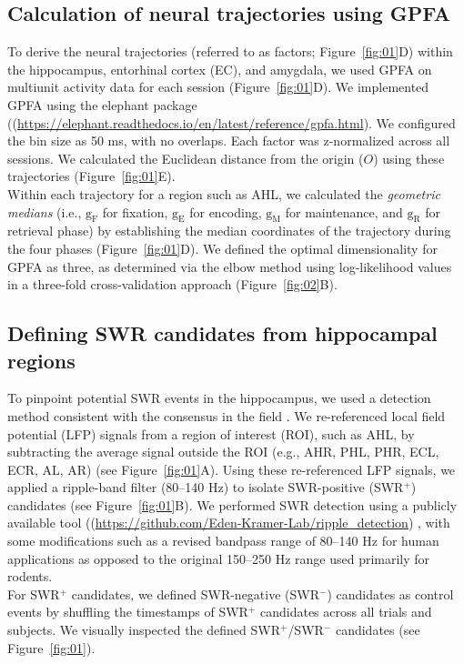 \documentclass[final,3p,times,twocolumn]{elsarticle}
\newcommand{\REDSTARTS}{\color{red}}
\newcommand{\GREENENDS}{\color{black}}
\begin{document}
\begin{abstract\GREENENDS \REDSTARTS ll_Tables}
\subsection{Calculation of neural trajectories using GPFA}
To derive the neural trajectories (referred to as factors; Figure~\ref{fig:01}D) within the hippocampus, entorhinal cortex (EC), and amygdala, we used GPFA \cite{yu_gaussian-process_2009} on multiunit activity data for each session (Figure~\ref{fig:01}D). We implemented GPFA using the elephant package ((\url{https://elephant.readthedocs.io/en/latest/reference/gpfa.html}). We configured the bin size as 50 ms, with no overlaps. Each factor was z-normalized across all sessions. We calculated the Euclidean distance from the origin ($O$) using these trajectories (Figure~\ref{fig:01}E).
\\
\indent
Within each trajectory for a region such as AHL, we calculated the \textit{geometric medians} (i.e., $\mathrm{g_{F}}$ for fixation, $\mathrm{g_{E}}$ for encoding, $\mathrm{g_{M}}$ for maintenance, and $\mathrm{g_{R}}$ for retrieval phase) by establishing the median coordinates of the trajectory during the four phases (Figure~\ref{fig:01}D). We defined the optimal dimensionality for GPFA as three, as determined via the elbow method using log-likelihood values in a three-fold cross-validation approach (Figure~\ref{fig:02}B).

\subsection{Defining SWR candidates from hippocampal regions}
To pinpoint potential SWR events in the hippocampus, we used a detection method consistent with the consensus in the field \cite{liu_consensus_2022}. We re-referenced local field potential (LFP) signals from a region of interest (ROI), such as AHL, by subtracting the average signal outside the ROI (e.g., AHR, PHL, PHR, ECL, ECR, AL, AR) (see Figure~\ref{fig:01}A). Using these re-referenced LFP signals, we applied a ripple-band filter (80--140 Hz) to isolate SWR-positive (SWR$^+$) candidates (see Figure~\ref{fig:01}B). We performed SWR detection using a publicly available tool ((\url{https://github.com/Eden-Kramer-Lab/ripple_detection}) \cite{kay_hippocampal_2016}, with some modifications such as a revised bandpass range of 80--140 Hz for human applications \cite{norman_hippocampal_2019,norman_hippocampal_2021} as opposed to the original 150--250 Hz range used primarily for rodents.
\\
\indent
For SWR$^+$ candidates, we defined SWR-negative (SWR$^-$) candidates as control events by shuffling the timestamps of SWR$^+$ candidates across all trials and subjects. We visually inspected the defined SWR$^+$/SWR$^-$ candidates (see Figure~\ref{fig:01}).


\end{abstract\GREENENDS \REDSTARTS ll_Tables}
\end{document}
